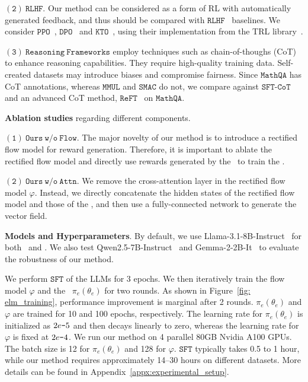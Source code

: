 $\mathtt{(2)\ RLHF}$. Our method can be considered as a form of RL with  automatically generated feedback, and thus should be compared with $\mathtt{RLHF}$~\cite{bai2022training} baselines. We consider $\mathtt{PPO}$~\cite{xu2024dpo}, $\mathtt{DPO}$~\cite{rafailov2024direct} and $\mathtt{KTO}$~\cite{ethayarajh2024kto}, using their implementation from the TRL library~\cite{von_Werra_TRL_Transformer_Reinforcement}. 

$\mathtt{(3)\ Reasoning\ Frameworks}$ employ techniques such as chain-of-thoughs (CoT) to enhance reasoning capabilities. They require high-quality training data. Self-created datasets may introduce biases and compromise fairness. Since $\mathtt{MathQA}$ has CoT annotations, whereas $\mathtt{MMUL}$ and $\mathtt{SMAC}$ do not, we compare against $\mathtt{SFT}$-$\mathtt{CoT}$~\cite{wei2022chain} and an advanced CoT method, $\mathtt{ReFT}$~\cite{trung2024reft} on $\mathtt{MathQA}$.


\textbf{Ablation studies} regarding different components.

$\mathtt{(1)\ Ours\ w/o\ Flow}$. The major novelty of our method is to introduce a rectified flow model for reward generation. Therefore, it is important to ablate the rectified flow model and directly use rewards generated by the \rlm~to train the \elm.

$\mathtt{(2)\ Ours\ w/o\ Attn}$. We remove the cross-attention layer in the rectified flow model $\varphi$. Instead, we directly concatenate the hidden states of the rectified flow model and those of the \rlm, and then use a fully-connected network to generate the vector field. 



\textbf{Models and Hyperparameters}. By default, we use Llama-3.1-8B-Instruct~\cite{dubey2024llama} for both \elm~and \rlm. We also test Qwen2.5-7B-Instruct~\cite{yang2024qwen2} and Gemma-2-2B-It~\cite{lieberum2024gemma} to evaluate the robustness of our method. 

We perform ${\mathtt{SFT}}$ of the LLMs for 3 epochs. We then iteratively train the flow model $\varphi$ and the \elm~$\pi_e(\theta_e)$ for two rounds. As shown in Figure~\ref{fig: elm_training}, performance improvement is marginal after 2 rounds. $\pi_e(\theta_e)$ and $\varphi$ are trained for 10 and 100 epochs, respectively. The learning rate for $\pi_e(\theta_e)$ is initialized as $2e\textup{\texttt{-}} 5$ and then decays linearly to zero, whereas the learning rate for $\varphi$ is fixed at $2e\textup{\texttt{-}} 4$. We run our method on 4 parallel 80GB Nvidia A100 GPUs. The batch size is 12 for $\pi_e(\theta_e)$ and 128 for $\varphi$. ${\mathtt{SFT}}$ typically takes 0.5 to 1 hour, while our method requires approximately 14--30 hours on different datasets. More details can be found in Appendix~\ref{appx:experimental_setup}.


